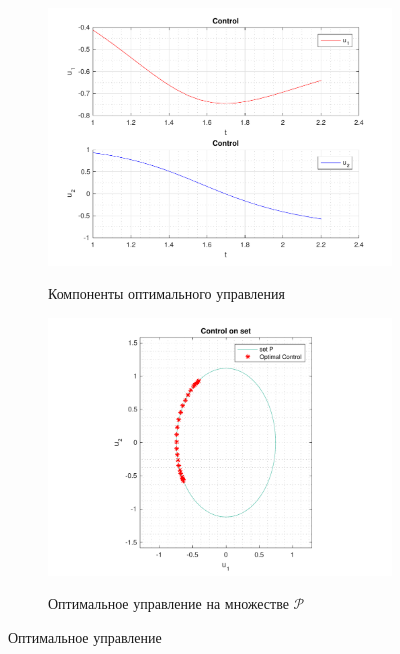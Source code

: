 \documentclass[11pt, oneside, final]{article}
\theoremstyle{break}
\numberwithin{equation}{section}
\theoremstyle{plain}
\theoremstyle{definition}
\begin{document}
    \begin{figure}[H]
        \begin{subfigure}{0.5\linewidth}
            \centering
            \includegraphics[width=\linewidth]{s4fig3}
            \label{pic:s4:3}
            \caption{Компоненты оптимального управления}
        \end{subfigure}
        \begin{subfigure}{0.5\linewidth}
            \centering
            \includegraphics[width=\linewidth]{s4fig4}
            \label{pic:s4:4}
            \caption{Оптимальное управление на множестве \(\mathcal{P}\)}
        \end{subfigure}
        \caption{Оптимальное управление}
    \end{figure}
\end{document}
